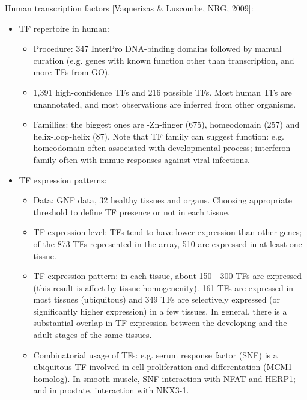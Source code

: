 \documentclass{report}
\begin{document}
\begin{enumerate}
	Human transcription factors [Vaquerizas \& Luscombe, NRG, 2009]: 
	\begin{itemize}
		\item TF repertoire in human: 
		\begin{itemize}
			\item Procedure: 347 InterPro DNA-binding domains followed by manual curation (e.g. genes with known function other than transcription, and more TFs from GO). 
			\item 1,391 high-confidence TFs and 216 possible TFs. Most human TFs are unannotated, and most observations are inferred from other organisms. 
			\item Famillies: the biggest ones are -Zn-finger (675), homeodomain (257) and helix-loop-helix (87). Note that TF family can suggest function: e.g. homeodomain often associated with developmental process; interferon family often with immue responses against viral infections. 
		\end{itemize}
		
		\item TF expression patterns: 
		\begin{itemize}
			\item Data: GNF data, 32 healthy tissues and organs. Choosing appropriate threshold to define TF presence or not in each tissue. 
			\item TF expression level: TFs tend to have lower expression than other genes; of the 873 TFs represented in the array, 510 are expressed in at least one tissue. 
			\item TF expression pattern: in each tissue, about 150 - 300 TFs are expressed (this result is affect by tissue homogenenity). 161 TFs are expressed in most tissues (ubiquitous) and 349 TFs are selectively expressed (or significantly higher expression) in a few tissues. In general, there is a substantial overlap in TF expression between the developing and the adult stages of the same tissues. 
			\item Combinatorial usage of TFs: e.g. serum response factor (SNF) is a ubiquitous TF involved in cell proliferation and differentation (MCM1 homolog). In smooth muscle, SNF interaction with NFAT and HERP1; and in prostate, interaction with NKX3-1. 
		\end{itemize}
		

\end{itemize}
\end{enumerate}
\end{document}
